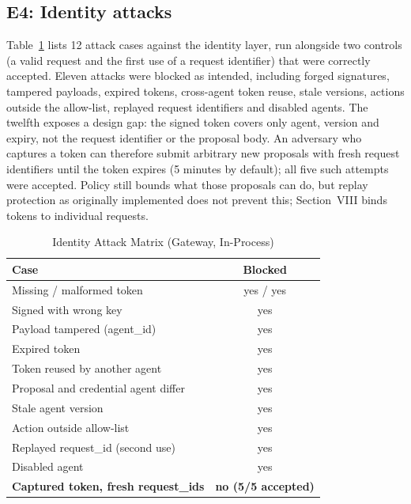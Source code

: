 \documentclass[conference]{IEEEtran}
\begin{document}
\subsection{E4: Identity attacks}
Table~\ref{tab:identity} lists 12 attack cases against the identity layer, run alongside two controls (a valid request and the first use of a request identifier) that were correctly accepted. Eleven attacks were blocked as intended, including forged signatures, tampered payloads, expired tokens, cross-agent token reuse, stale versions, actions outside the allow-list, replayed request identifiers and disabled agents. The twelfth exposes a design gap: the signed token covers only agent, version and expiry, not the request identifier or the proposal body. An adversary who captures a token can therefore submit arbitrary new proposals with fresh request identifiers until the token expires (5 minutes by default); all five such attempts were accepted. Policy still bounds what those proposals can do, but replay protection as originally implemented does not prevent this; Section~VIII binds tokens to individual requests.

\begin{table}[t]
\caption{Identity Attack Matrix (Gateway, In-Process)}
\label{tab:identity}
\centering
\begin{tabular}{|l|c|}
\hline
\textbf{Case} & \textbf{Blocked} \\
\hline
Missing / malformed token & yes / yes \\
Signed with wrong key & yes \\
Payload tampered (agent\_id) & yes \\
Expired token & yes \\
Token reused by another agent & yes \\
Proposal and credential agent differ & yes \\
Stale agent version & yes \\
Action outside allow-list & yes \\
Replayed request\_id (second use) & yes \\
Disabled agent & yes \\
\textbf{Captured token, fresh request\_ids} & \textbf{no (5/5 accepted)} \\
\hline
\end{tabular}
\end{table}
\end{document}
